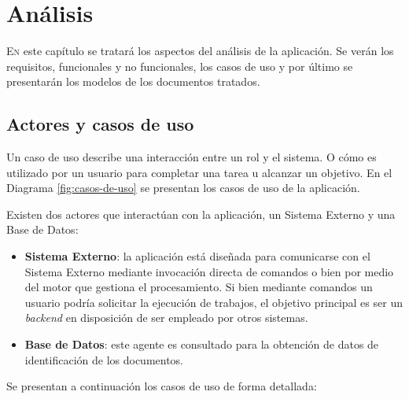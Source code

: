 
\chapter{Análisis}
\label{chap:analisis}

\lettrine{E}{n} este capítulo se tratará los aspectos del análisis de la aplicación. Se verán los requisitos, funcionales y no funcionales, los casos de uso y por último se presentarán los modelos de los documentos tratados.

\section{Actores y casos de uso}

Un caso de uso describe una interacción entre un rol y el sistema. O cómo es utilizado por un usuario para completar una tarea u alcanzar un objetivo. En el Diagrama \ref{fig:casos-de-uso} se presentan los casos de uso de la aplicación. 

Existen dos actores que interactúan con la aplicación, un Sistema Externo y una Base de Datos:

\begin{itemize}
	\item \textbf{Sistema Externo}: la aplicación está diseñada para comunicarse con el Sistema Externo mediante invocación directa de comandos o bien por medio del motor que gestiona el procesamiento. Si bien mediante comandos un usuario podría solicitar la ejecución de trabajos, el objetivo principal es ser un \emph{backend} en disposición de ser empleado por otros sistemas.
	\item \textbf{Base de Datos}: este agente es consultado para la obtención de datos de identificación de los documentos.
\end{itemize}

Se presentan a continuación los casos de uso de forma detallada:

